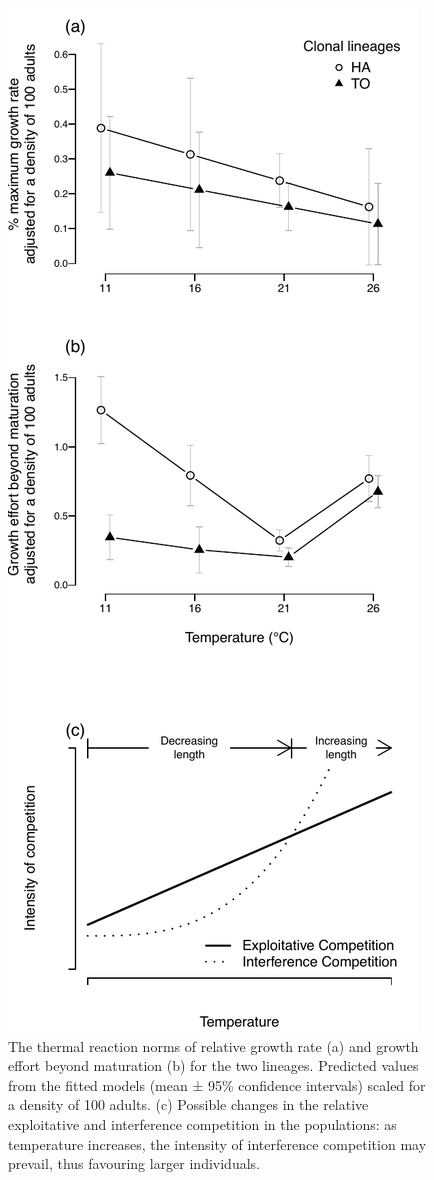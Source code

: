 \begin{figure}[!ht] %
\centering
\includegraphics[height=0.8\textheight]{5_ChapExp3/fig/Fig5} 
\caption[Thermal reaction norms of relative
growth rate and GEBM]{ The thermal reaction norms of relative growth rate (a)
and growth effort beyond maturation (b) for the two lineages. Predicted values from the fitted models
(mean ± 95\% confidence intervals) scaled for a density of 100 adults. (c)
Possible changes in the relative exploitative and interference competition in
the populations: as temperature increases, the intensity of interference
competition may prevail, thus favouring larger individuals.}
\label{Fig5-5}
\end{figure}


